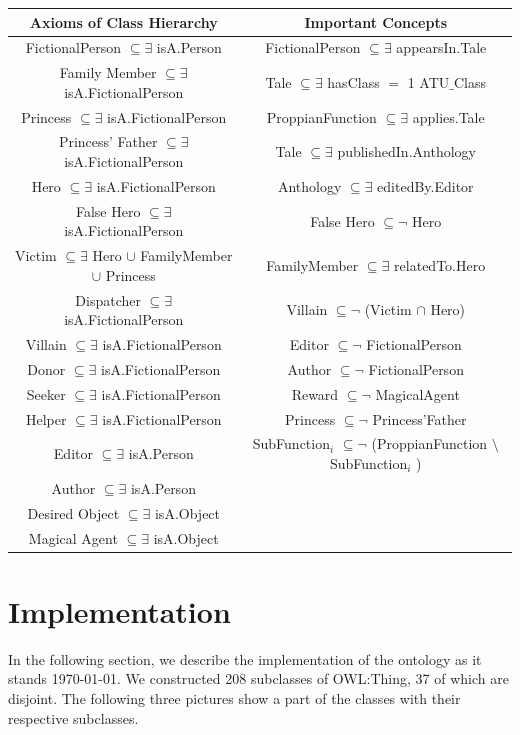 \documentclass[10pt,a4paper]{article}
\begin{document}
\begin{tabular}{|c|c|}
Axioms of Class Hierarchy & Important Concepts \\
\hline

FictionalPerson $\subseteq \exists $ isA.Person & FictionalPerson $\subseteq \exists$ appearsIn.Tale \\
Family Member $\subseteq \exists $ isA.FictionalPerson & Tale $\subseteq \exists$ hasClass $=$ 1 ATU$\_$Class  \\
Princess $\subseteq \exists $ isA.FictionalPerson & ProppianFunction $\subseteq \exists$ applies.Tale \\
Princess' Father $\subseteq \exists $ isA.FictionalPerson & Tale  $\subseteq \exists$ publishedIn.Anthology   \\
Hero $\subseteq \exists $ isA.FictionalPerson & Anthology $\subseteq \exists$ editedBy.Editor    \\
False Hero $\subseteq \exists $ isA.FictionalPerson & False Hero $\subseteq \neg$ Hero  \\
Victim $\subseteq \exists $ Hero $\cup$ FamilyMember $\cup$ Princess & FamilyMember $\subseteq \exists$ relatedTo.Hero \\

Dispatcher $\subseteq \exists $ isA.FictionalPerson  & Villain $\subseteq \neg$ (Victim $\cap$ Hero) \\
Villain $\subseteq \exists $ isA.FictionalPerson &  Editor  $\subseteq \neg$ FictionalPerson  \\
Donor $\subseteq \exists $ isA.FictionalPerson & Author  $\subseteq \neg$ FictionalPerson   \\
Seeker $\subseteq \exists $ isA.FictionalPerson & Reward $\subseteq \neg$ MagicalAgent  \\
Helper $\subseteq \exists $ isA.FictionalPerson & Princess $\subseteq \neg$ Princess'Father \\
Editor $\subseteq \exists $ isA.Person & SubFunction$_{i}$ $\subseteq \neg$ (ProppianFunction $\setminus$ SubFunction$_{i}$ )  \\
Author $\subseteq \exists $ isA.Person   \\
Desired Object $\subseteq \exists $ isA.Object   \\
Magical Agent $\subseteq \exists $ isA.Object  \\



\end{tabular} 


\section{Implementation}
In the following section, we describe the implementation of the ontology as it stands \today. 
We constructed 208 subclasses of OWL:Thing, 37 of which are disjoint. The following three pictures show a part of the classes with their respective subclasses. 
\end{document}
